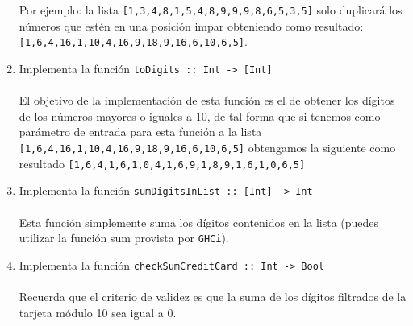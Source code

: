 \begin{exercise}
\begin{enumerate}
                  Por ejemplo: la lista \texttt{[1,3,4,8,1,5,4,8,9,9,9,8,6,5,3,5]} solo duplicará los números que estén en una posición impar obteniendo como resultado: \texttt{[1,6,4,16,1,10,4,16,9,18,9,16,6,10,6,5]}. \\
           \item  Implementa la función \texttt{toDigits :: Int ->\ [Int]}\\\\
                  El objetivo de la implementación de esta función es el de obtener los dígitos de los números mayores o iguales a 10, de tal forma que si tenemos como parámetro de entrada para esta función a la lista \texttt{[1,6,4,16,1,10,4,16,9,18,9,16,6,10,6,5]} obtengamos la siguiente como resultado \texttt{[1,6,4,1,6,1,0,4,1,6,9,1,8,9,1,6,1,0,6,5]} \\
           \item  Implementa la función \texttt{sumDigitsInList :: [Int] ->\ Int} \\\\
                  Esta función simplemente suma los dígitos contenidos en la lista (puedes utilizar la función sum provista por \texttt{GHCi}).\\
           \item  Implementa la función \texttt{checkSumCreditCard :: Int ->\ Bool}\\\\
                  Recuerda que el criterio de validez es que la suma de los dígitos filtrados de la tarjeta módulo 10 sea igual a 0.
                    
        \end{enumerate}    
    \end{exercise}

